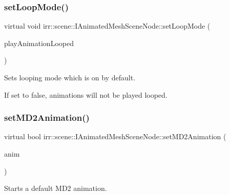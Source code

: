 \subsubsection{\texorpdfstring{set\+Loop\+Mode()}{setLoopMode()}}
{\footnotesize\ttfamily virtual void irr\+::scene\+::\+I\+Animated\+Mesh\+Scene\+Node\+::set\+Loop\+Mode (\begin{DoxyParamCaption}\item[{bool}]{play\+Animation\+Looped }\end{DoxyParamCaption})\hspace{0.3cm}{\ttfamily [pure virtual]}}



Sets looping mode which is on by default. 

If set to false, animations will not be played looped. \mbox{\label{classirr_1_1scene_1_1IAnimatedMeshSceneNode_aca2ca2593857c60aac61c0fd78365d2d}} 
\subsubsection{\texorpdfstring{set\+M\+D2\+Animation()}{setMD2Animation()}\hspace{0.1cm}{\footnotesize\ttfamily [1/2]}}
{\footnotesize\ttfamily virtual bool irr\+::scene\+::\+I\+Animated\+Mesh\+Scene\+Node\+::set\+M\+D2\+Animation (\begin{DoxyParamCaption}\item[{\hyperlink{namespaceirr_1_1scene_a08d4a84966e1d2886d0d57e4acbb4f19}{E\+M\+D2\+\_\+\+A\+N\+I\+M\+A\+T\+I\+O\+N\+\_\+\+T\+Y\+PE}}]{anim }\end{DoxyParamCaption})\hspace{0.3cm}{\ttfamily [pure virtual]}}



Starts a default M\+D2 animation. 

